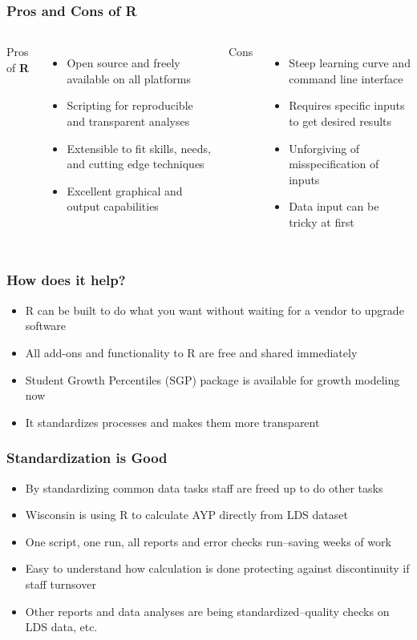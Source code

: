 \documentclass{beamer}
\begin{document}
\begin{frame}
\frametitle{Pros and Cons of R}
  \begin{columns}
  Pros of \textbf{R}
  \begin{itemize}
  \item Open source and freely available on all platforms
  \item Scripting for reproducible and transparent analyses
  \item Extensible to fit skills, needs, and cutting edge techniques
  \item Excellent graphical and output capabilities
  \end{itemize}
  Cons
  \begin{itemize}
  \item Steep learning curve and command line interface
  \item Requires specific inputs to get desired results
  \item Unforgiving of misspecification of inputs
  \item Data input can be tricky at first
  \end{itemize}
  \end{columns}
\end{frame}

\begin{frame}
\frametitle{How does it help?}
\begin{itemize}
  \item R can be built to do what you want without waiting for a vendor to upgrade software
  \pause
  \item All add-ons and functionality to R are free and shared immediately
  \pause 
  \item Student Growth Percentiles (SGP) package is available for growth modeling now
  \pause 
  \item It standardizes processes and makes them more transparent
\end{itemize}
\end{frame}

\begin{frame}
\frametitle{Standardization is Good}
\begin{itemize}
  \item By standardizing common data tasks staff are freed up to do other tasks
  \pause
  \item Wisconsin is using R to calculate AYP directly from LDS dataset
  \pause
  \item One script, one run, all reports and error checks run--saving weeks of work
  \pause
  \item Easy to understand how calculation is done protecting against discontinuity if staff turnsover
  \pause
  \item Other reports and data analyses are being standardized--quality checks on LDS data, etc.
\end{itemize}
\end{frame}
  
\end{document}
